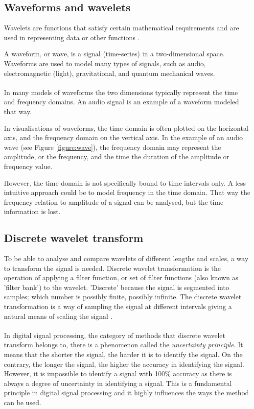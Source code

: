 \subsection{Waveforms and wavelets}
Wavelets are functions that satisfy certain mathematical requirements and are
used in representing data or other functions \cite{graps}.

A waveform, or wave, is a signal (time-series) in a two-dimensional space.
Waveforms are used to model many types of signals, such as audio,
electromagnetic (light), gravitational, and quantum mechanical waves.

\paragraph{}
In many models of waveforms the two dimensions typically represent the time and
frequency domains. An audio signal is an example of a waveform modeled that way.

In visualisations of waveforms, the time domain is often plotted on the
horizontal axis, and the frequency domain on the vertical axis. In the example
of an audio wave (see Figure \ref{figure:wave}), the frequency domain may
represent the amplitude, or the frequency, and the time the duration of the
amplitude or frequency value.



However, the time domain is not specifically bound to time intervals only. A
less intuitive approach could be to model frequency in the time domain. That
way the frequency relation to amplitude of a signal can be analysed, but the
time information is lost.

\subsection{Discrete wavelet transform}
To be able to analyse and compare wavelets of different lengths and scales, a
way to transform the signal is needed. Discrete wavelet transformation is the
operation of applying a filter function, or set of filter functions (also known
as 'filter bank') to the wavelet. 'Discrete' because the signal is segmented
into samples; which number is possibly finite, possibly infinite. The
discrete wavelet transformation is a way of sampling the signal at different
intervals giving a natural means of scaling the signal \cite{karus2013}.

\paragraph{}
In digital signal processing, the category of methods that discrete wavelet
transform belongs to, there is a phenomenon called the \textit{uncertainty
principle}. It means that the shorter the signal, the harder it is to
identify the signal. On the contrary, the longer the signal, the higher the
accuracy in identifying the signal. However, it is impossible to identify a
signal with 100\% accuracy as there is always a degree of uncertainty in
identifying a signal. This is a fundamental principle in digital signal
processing and it highly influences the ways the method can be used.

